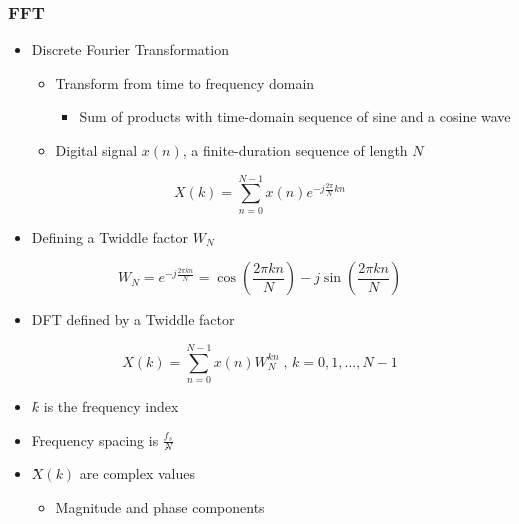 \subsubsection{FFT}
\begin{itemize}
	\item Discrete Fourier Transformation
	\begin{itemize}
		\item Transform from time to frequency domain
		\begin{itemize}
			\item Sum of products with time-domain sequence of sine and a cosine wave
		\end{itemize}
		\item Digital signal $x(n)$, a finite-duration sequence of length $N$
	\end{itemize}
\end{itemize}

\begin{equation}
X(k)=\sum_{n=0}^{N-1}x(n)e^{-j\frac{2\pi}{N}kn}
\end{equation}

\begin{itemize}
	\item Defining a Twiddle factor $W_N$
\end{itemize}

\begin{equation}
W_N=e^{-j\frac{2\pi kn}{N}}=\cos\left(\dfrac{2\pi kn}{N}\right)-j\sin\left(\dfrac{2\pi kn}{N}\right)
\end{equation}

\begin{itemize}
	\item DFT defined by a Twiddle factor
\end{itemize}

\begin{equation}
X(k)=\sum_{n=0}^{N-1}x(n)W_N^{kn}\;,\,k=0,1,...,N-1
\end{equation}

\begin{itemize}
	\item ݇$k$ is the frequency index
	\item Frequency spacing is ݂$\frac{f_s}{N}$
	\item ܺ$X(k)$ are complex values
	\begin{itemize}
		\item Magnitude and phase components
	\end{itemize} 
\end{itemize}

